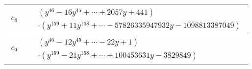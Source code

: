 \documentclass[1p]{elsarticle_modified}
\theoremstyle{definition}
\begin{document}
\begin{tabular}{m{50pt}|m{274pt}}
\hline $$\begin{aligned}c_{8}\end{aligned}$$&$\begin{aligned}
&(y^{46}-16 y^{45}+\cdots+2057 y+441)\\
&\cdot(y^{159}+11 y^{158}+\cdots-57826335947932 y-1098813387049)
\end{aligned}$\\
\hline $$\begin{aligned}c_{9}\end{aligned}$$&$\begin{aligned}
&(y^{46}-12 y^{45}+\cdots-22 y+1)\\
&\cdot(y^{159}-21 y^{158}+\cdots+100453631 y-3829849)
\end{aligned}$\\
\hline
\end{tabular}
\vskip 2pc
\end{document}
